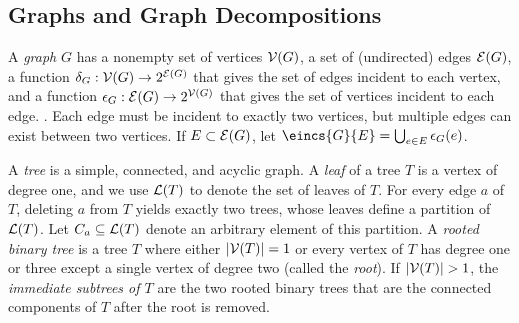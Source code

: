 
\subsection{Graphs and Graph Decompositions}
A \emph{graph} $G$ has a nonempty set of vertices $\mathcal{V}(G)$, a set of (undirected) edges $\mathcal{E}(G)$, a function $\delta_G: \mathcal{V}(G) \rightarrow 2^{\mathcal{E}(G)}$ that gives the set of edges incident to each vertex, and a function $\epsilon_G: \mathcal{E}(G) \rightarrow 2^{\mathcal{V}(G)}$ that gives the set of vertices incident to each edge. . Each edge must be incident to exactly two vertices, but multiple edges can
exist between two vertices. If $E \subset \mathcal{E}(G)$, let $\eincs{G}{E} = \bigcup_{e \in E} \einc{G}{e}$. %

A \emph{tree} is a simple, connected, and acyclic graph. A \emph{leaf} of a tree $T$ is a vertex of degree one, and we use $\mathcal{L}(T)$ to denote the set of leaves of $T$. For every edge $a$ of $T$, deleting $a$ from $T$ yields exactly two trees, whose leaves define a partition of $\mathcal{L}(T)$. Let $C_a \subseteq \mathcal{L}(T)$ denote an arbitrary element of this partition. A \emph{rooted binary tree} is a tree $T$ where either $|\mathcal{V}(T)| = 1$ or every vertex of $T$ has degree one or three except a single vertex of degree two (called the \emph{root}). If $|\mathcal{V}(T)| > 1$, the \emph{immediate subtrees of $T$} are the two rooted binary trees that are the connected components of $T$ after the root is removed.

